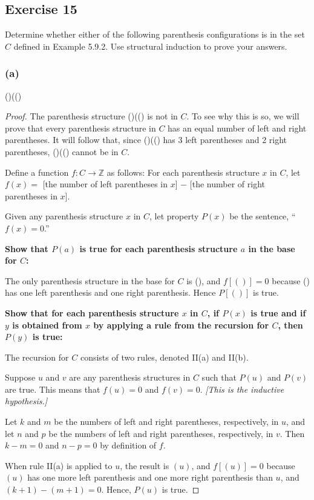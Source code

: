 \documentclass[14pt]{extarticle}
\newcommand{\Z}{\mathbb{Z}}
\begin{document}
\subsection{Exercise 15}
Determine whether either of the following parenthesis configurations is in the set $C$ defined in Example 5.9.2. 
Use structural induction to prove your answers.

\subsubsection{(a)}
()(()

\begin{proof}
The parenthesis structure ()(() is not in $C$. To see why this is so, we will prove that every parenthesis structure 
in $C$ has an equal number of left and right parentheses. It will follow that, since ()(() has 3 left parentheses and 
2 right parentheses, ()(() cannot be in $C$.

Define a function \(f: C \to \Z\) as follows: For each parenthesis structure $x$ in $C$, let \(f(x) = \)
[the number of left parentheses in $x$] $-$ [the number of right parentheses in $x$].

Given any parenthesis structure $x$ in $C$, let property $P(x)$ be the sentence, “$f(x) = 0$.”

{\bf Show that $P(a)$ is true for each parenthesis structure $a$ in the base for $C$:}

The only parenthesis structure in the base for $C$ is (), and $f[()] = 0$ because () has one left parenthesis and one right parenthesis. Hence $P[( )]$ is true. 

{\bf Show that for each parenthesis structure $x$ in $C$, if $P(x)$ is true and if $y$ is obtained from $x$ by 
applying a rule from the recursion for $C$, then $P(y)$ is true:}

The recursion for $C$ consists of two rules, denoted II(a) and II(b).

Suppose $u$ and $v$ are any parenthesis structures in $C$ such that $P(u)$ and $P(v)$ are true. This means that 
$f(u) = 0$ and $f(v) = 0$. {\it [This is the inductive hypothesis.]}

Let $k$ and $m$ be the numbers of left and right parentheses, respectively, in $u$, and let $n$ and $p$ be 
the numbers of left and right parentheses, respectively, in $v$. Then \(k - m = 0\) and \(n - p = 0\) by definition of $f$. 

When rule II(a) is applied to $u$, the result is $(u)$, and \(f[(u)] = 0\) because $(u)$ has one more left parenthesis 
and one more right parenthesis than $u$, and \((k + 1) - (m + 1) = 0\). Hence, $P(u)$ is true. 


\end{proof}
\end{document}
